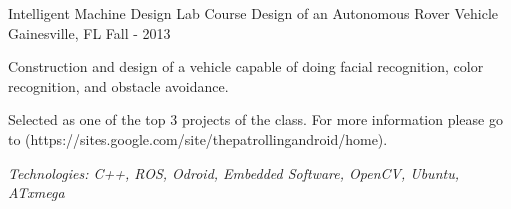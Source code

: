 \begin{cventries}
	\cventry
		{Intelligent Machine Design Lab Course} %
		{Design of an Autonomous Rover Vehicle} %
		{Gainesville, FL} %
		{Fall - 2013} %
		{
			\begin{cvitems} %
				\item {Construction and design of a vehicle capable of doing facial recognition, color recognition, and
					obstacle avoidance.}
				\item {Selected as one of the top 3 projects of the class. For more information please go to
					(https://sites.google.com/site/thepatrollingandroid/home).}
				\item {\it{Technologies:} C++, ROS, Odroid, Embedded Software, OpenCV, Ubuntu, ATxmega}
			\end{cvitems}
		}

\end{cventries}
